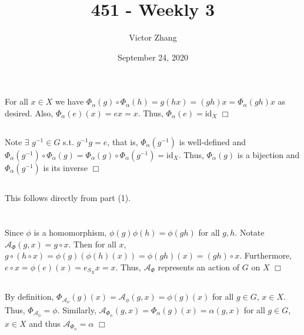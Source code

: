 \documentclass{article}
\title{451 - Weekly 3}
\author{Victor Zhang}
\date{September 24, 2020}
\begin{document}
\maketitle

\section{}
\subsection{}
For all $x \in X$ we have $\Phi_\alpha(g) \circ \Phi_\alpha(h) = g(hx) = (gh)x = \Phi_\alpha(gh)x$ as desired. Also, $\Phi_\alpha(e)(x) = ex = x$. Thus, $\Phi_\alpha(e) = \mathrm{id}_X$ $\Box$

\subsection{}
Note $\exists$ $g^{-1} \in G$ s.t. $g^{-1}g = e$, that is, $\Phi_\alpha(g^{-1})$ is well-defined and $\Phi_\alpha(g^{-1}) \circ \Phi_\alpha(g) = \Phi_\alpha(g) \circ \Phi_\alpha(g^{-1}) = \mathrm{id}_X$. Thus, $\Phi_\alpha(g)$ is a bijection and $\Phi_\alpha(g^{-1})$ is its inverse $\Box$

\subsection{}
This follows directly from part (1).

\section{}
\subsection{}
Since $\phi$ is a homomorphism, $\phi(g)\phi(h) = \phi(gh)$ for all $g,h$. Notate $\mathcal{A}_\Phi(g,x) = g \circ x$. Then for all $x$, $g \circ (h \circ x) = \phi(g)(\phi(h)(x)) = \phi(gh)(x) = (gh) \circ x$. Furthermore, $e \circ x = \phi(e)(x) = e_{S_X} x = x$. Thus, $\mathcal{A}_\Phi$ represents an action of $G$ on $X$ $\Box$

\subsection{}
By definition, $\Phi_{\mathcal{A}_\phi}(g)(x) = \mathcal{A}_\phi(g,x) = \phi(g)(x)$ for all $g \in G$, $x \in X$. Thus, $\Phi_{\mathcal{A}_\phi} = \phi$. Similarly, $\mathcal{A}_{\Phi_\alpha}(g,x) = \Phi_\alpha(g)(x) = \alpha(g,x)$ for all $g \in G$, $x \in X$ and thus $\mathcal{A}_{\Phi_\alpha} = \alpha$ $\Box$
\end{document}

